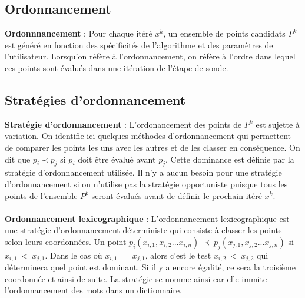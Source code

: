\documentclass[letterpaper]{scrartcl}
\begin{document}
	\subsection{Ordonnancement}
\textbf{Ordonnnancement} : Pour chaque itéré $x^k$, un ensemble de points candidats $P^k$ est généré en fonction des spécificités de l'algorithme et des paramètres de l'utilisateur. Lorsqu'on réfère à l'ordonnancement, on réfère à l'ordre dans lequel ces points sont évalués dans une itération de l'étape de sonde. 
	\subsection{Stratégies d'ordonnancement}
\textbf{Stratégie d'ordonnancement} : L'ordonancement des points de $P^k$ est sujette à variation. On identifie ici quelques méthodes d'ordonnancement qui permettent de comparer les points les uns avec les autres et de les classer en conséquence. On dit que $p_i \prec p_j$ si $p_i$ doit être évalué avant $p_j$. Cette dominance est définie par la stratégie d'ordonnancement utilisée. Il n'y a aucun besoin pour une stratégie d'ordonnancement si on n'utilise pas la stratégie opportuniste puisque tous les points de l'ensemble $P^k$ seront évalués avant de définir le prochain itéré $x^k$. \\\\

\indent \textbf{Ordonnancement lexicographique} : L'ordonnancement lexicographique est une stratégie d'ordonnancement déterministe qui consiste à classer les points selon leurs coordonnées. Un point $p_i(x_{i,1},x_{i,2}...x_{i,n}) \ \prec \ p_j(x_{j,1},x_{j,2}...x_{j,n})$ si $x_{i,1}\ <\ x_{j,1}$. Dans le cas où $x_{i,1}\ =\ x_{j,1}$, alors c'est le test $x_{i,2}\ <\ x_{j,2}$ qui déterminera quel point est dominant. Si il y a encore égalité, ce sera la troisième coordonnée et ainsi de suite. La stratégie se nomme ainsi car elle immite l'ordonnancement des mots dans un dictionnaire.\\\\
\end{document}
